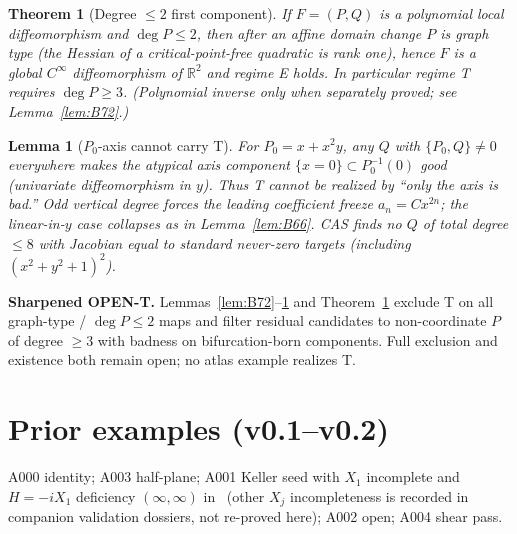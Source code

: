 ﻿\documentclass[11pt]{article}
\newtheorem{theorem}{Theorem}
\newtheorem{lemma}{Lemma}
\begin{document}
\begin{theorem}[Degree \(\le 2\) first component]
\label{thm:B73}
If \(F=(P,Q)\) is a polynomial local diffeomorphism and \(\deg P\le 2\), then after
an affine domain change \(P\) is graph type (the Hessian of a critical-point-free
quadratic is rank one), hence \(F\) is a global \(C^\infty\) diffeomorphism of
\(\mathbb{R}^2\) and regime E holds. In particular regime T requires \(\deg P\ge 3\).
(Polynomial inverse only when separately proved; see Lemma~\ref{lem:B72}.)
\end{theorem}

\begin{lemma}[$P_0$-axis cannot carry T]
\label{lem:B76}
For \(P_0=x+x^2 y\), any \(Q\) with \(\{P_0,Q\}\neq 0\) everywhere makes the
atypical axis component \(\{x=0\}\subset P_0^{-1}(0)\) good (univariate
diffeomorphism in \(y\)). Thus T cannot be realized by ``only the axis is bad.''
Odd vertical degree forces the leading coefficient freeze \(a_n=C x^{2n}\); the
linear-in-\(y\) case collapses as in Lemma~\ref{lem:B66}. CAS finds no \(Q\) of
total degree \(\le 8\) with Jacobian equal to standard never-zero targets
(including \((x^2+y^2+1)^2\)).
\end{lemma}

\noindent\textbf{Sharpened OPEN-T.} Lemmas~\ref{lem:B72}--\ref{lem:B76} and
Theorem~\ref{thm:B73} exclude T on all graph-type / \(\deg P\le 2\) maps and
filter residual candidates to non-coordinate \(P\) of degree \(\ge 3\) with
badness on bifurcation-born components. Full exclusion and existence both remain
open; no atlas example realizes T.

\section{Prior examples (v0.1--v0.2)}
A000 identity; A003 half-plane; A001 Keller seed with \(X_1\) incomplete and
\(H=-iX_1\) deficiency \((\infty,\infty)\) in~\cite{A001} (other \(X_j\) incompleteness
is recorded in companion validation dossiers, not re-proved here);
A002 open; A004 shear pass.
\end{document}
